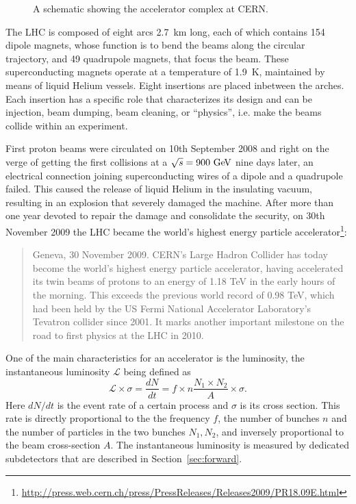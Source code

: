 \begin{figure}[tb]\begin{center}
	\caption{A schematic showing the accelerator complex at CERN.\label{fig:lhcring}}
\end{center}\end{figure}



The LHC is composed of eight arcs 2.7~km long, each of which contains 154 dipole 
magnets, whose function is to  bend the beams along the circular trajectory, and
49 quadrupole magnets, that focus the beam. These superconducting magnets operate
at a temperature of 1.9~K, maintained by means of liquid Helium vessels.
Eight insertions are placed inbetween the arches. Each insertion has a specific
role that characterizes its design and can be injection, beam dumping, beam cleaning,
or ``physics'', i.e. make the beams collide within an experiment.

First proton beams were circulated on 10th September 2008 and right on the verge of
getting the first collisions at a \cme $\rts=900\gev$ nine days later, an electrical
connection joining superconducting wires of a dipole and a quadrupole
failed. This caused the release of liquid Helium in the insulating vacuum,
resulting in an explosion that severely damaged the machine.
After more than one year devoted to repair the damage and consolidate the security,
on 30th November 2009 the LHC became the world's highest energy particle 
accelerator\footnote{\url{http://press.web.cern.ch/press/PressReleases/Releases2009/PR18.09E.html}}:
\begin{quotation}\small
Geneva, 30 November 2009. CERN's Large Hadron Collider has today become the world’s highest energy particle accelerator, having accelerated its twin beams of protons to an energy of 1.18 TeV in the early hours of the morning. This exceeds the previous world record of 0.98 TeV, which had been held by the US Fermi National Accelerator Laboratory’s Tevatron collider since 2001. It marks another important milestone on the road to first physics at the LHC in 2010.
\end{quotation}


One of the main characteristics for an accelerator is the luminosity, the 
instantaneous luminosity $\mathcal L$ being defined as 
\begin{equation}\label{eq:lumiN}
\mathcal{L}\times\sigma=\dfrac{dN}{dt}=f\times n\dfrac{N_1\times N_2}{A}\times\sigma.
\end{equation} 
Here $dN/dt $ is the event rate of a certain process and $\sigma$ is its cross 
section. This rate is directly proportional to the the frequency $f$, the number 
of bunches $n$ and the number of particles in the two bunches $N_1, N_2$, and
inversely proportional to the beam cross-section $A$.
The instantaneous luminosity is measured by dedicated subdetectors that are
described in Section~\ref{sec:forward}.

